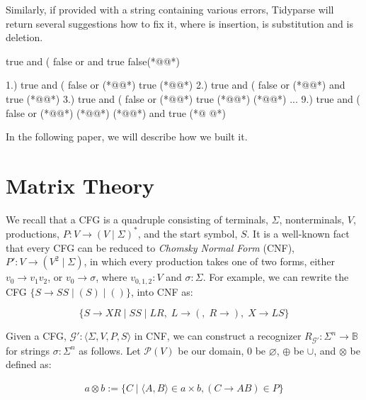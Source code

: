 \documentclass[sigplan,review,anonymous,acmsmall]{acmart}\settopmatter{printfolios=false,printccs=false,printacmref=false}
\begin{document}
    \noindent Similarly, if provided with a string containing various errors, Tidyparse will return several suggestions how to fix it, where  is insertion,  is substitution and  is deletion.

\begin{tidyinput}
true and ( false or and true false(*@\caret{ }@*)
\end{tidyinput}

\begin{tidyoutput}
1.) true and ( false or (*@\hlorange{!}@*) true (*@\hlorange{)}@*)
2.) true and ( false or (*@@*) and true (*@\hlorange{)}@*)
3.) true and ( false or (*@\hlorange{(}@*) true (*@\hlorange{)}@*) (*@\hlgreen{)}@*)
...
9.) true and ( false or (*@\hlgreen{!}@*) (*@@*) (*@\hlgreen{)}@*) and true (*@ @*)
\end{tidyoutput}

    \noindent In the following paper, we will describe how we built it.

    \section{Matrix Theory}

    We recall that a CFG is a quadruple consisting of terminals, $\Sigma$, nonterminals, $V$, productions, $P: V \rightarrow (V \mid \Sigma)^*$, and the start symbol, $S$. It is a well-known fact that every CFG can be reduced to \textit{Chomsky Normal Form} (CNF), $P': V \rightarrow (V^2 \mid \Sigma)$, in which every production takes one of two forms, either $v_0 \rightarrow v_1 v_2$, or $v_0 \rightarrow \sigma$, where $v_{0, 1, 2}: V$ and $\sigma: \Sigma$. For example, we can rewrite the CFG $\{S \rightarrow S S \mid ( S ) \mid ()\}$, into CNF as:\vspace{-10pt}

    \[
        \{S\rightarrow XR \mid SS \mid LR,\; L \rightarrow (,\; R \rightarrow ),\; X\rightarrow LS\}
    \]

    \noindent Given a CFG, $\mathcal{G}' : \langle \Sigma, V, P, S\rangle$ in CNF, we can construct a recognizer $R_{\mathcal{G}'}: \Sigma^n \rightarrow \mathbb{B}$ for strings $\sigma: \Sigma^n$ as follows. Let $\mathcal P(V)$ be our domain, $0$ be $\varnothing$, $\oplus$ be $\cup$, and $\otimes$ be defined as:\vspace{-10pt}

    \begin{align}
        a \otimes b := \{C \mid \langle A, B\rangle \in a \times b, (C\rightarrow AB) \in P\}
    \end{align}
\end{document}
